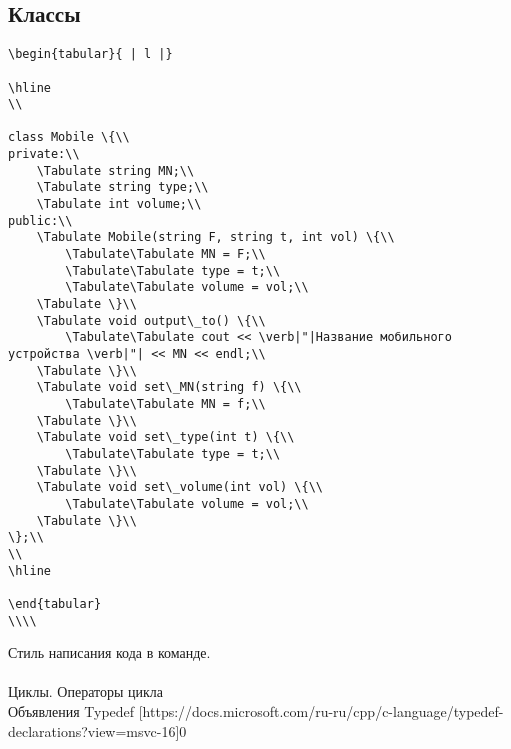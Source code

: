 \documentclass{article}
\begin{document}
\subsection{Классы}
\begin{lstlisting}
\begin{tabular}{ | l |}

\hline
\\

class Mobile \{\\
private:\\
    \Tabulate string MN;\\
    \Tabulate string type;\\
    \Tabulate int volume;\\
public:\\
    \Tabulate Mobile(string F, string t, int vol) \{\\
        \Tabulate\Tabulate MN = F;\\
        \Tabulate\Tabulate type = t;\\
        \Tabulate\Tabulate volume = vol;\\
    \Tabulate \}\\
    \Tabulate void output\_to() \{\\
        \Tabulate\Tabulate cout << \verb|"|Название мобильного устройства \verb|"| << MN << endl;\\
    \Tabulate \}\\
    \Tabulate void set\_MN(string f) \{\\
        \Tabulate\Tabulate MN = f;\\
    \Tabulate \}\\
    \Tabulate void set\_type(int t) \{\\
        \Tabulate\Tabulate type = t;\\
    \Tabulate \}\\
    \Tabulate void set\_volume(int vol) \{\\
        \Tabulate\Tabulate volume = vol;\\
    \Tabulate \}\\
\};\\
\\
\hline

\end{tabular}
\\\\
\end{lstlisting}
\newpage
\begin{thebibliography}{1}
Стиль написания кода в команде.\\ [https://doka.guide/js/code-style/]\\
Циклы. Операторы цикла\\
[https://www.bestprog.net/ru/2017/09/04/cycles-operators-of-the-cycle-for-while-do-while\_ru/]
Объявления Typedef
[https://docs.microsoft.com/ru-ru/cpp/c-language/typedef-declarations?view=msvc-16]0\\
\end{thebibliography}

\end{document}
